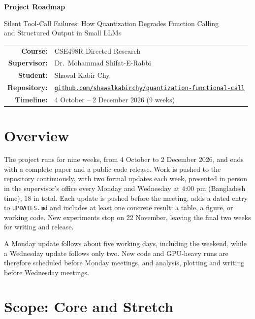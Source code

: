 \documentclass[11pt,a4paper]{article}
\newcommand{\studentname}{Shawal Kabir Chy.}
\begin{document}
{\centering\LARGE\bfseries Project Roadmap\par}
\vspace{6pt}
{\centering\large Silent Tool-Call Failures: How Quantization Degrades Function Calling\\
and Structured Output in Small LLMs\par}
\vspace{12pt}
{\centering
\begin{tabular}{rl}
\textbf{Course:}     & CSE498R Directed Research \\
\textbf{Supervisor:} & Dr.\ Mohammad Shifat-E-Rabbi \\
\textbf{Student:}    & \studentname \\
\textbf{Repository:} & \href{https://github.com/shawalkabirchy/quantization-functional-call}{\texttt{github.com/shawalkabirchy/quantization-functional-call}} \\
\textbf{Timeline:}   & 4 October -- 2 December 2026 (9 weeks) \\
\end{tabular}\par}
\vspace{6pt}

\section{Overview}

The project runs for nine weeks, from 4 October to 2 December 2026, and ends with a complete paper
and a public code release. Work is pushed to the repository continuously, with two formal updates
each week, presented in person in the supervisor's office every Monday and Wednesday at 4:00 pm
(Bangladesh time), 18 in total. Each update is pushed before the meeting, adds a dated entry to
\texttt{UPDATES.md} and includes at least one concrete result: a table, a figure, or working code.
New experiments stop on 22 November, leaving the final two weeks for writing and release.

A Monday update follows about five working days, including the weekend, while a Wednesday update
follows only two. New code and GPU-heavy runs are therefore scheduled before Monday meetings, and
analysis, plotting and writing before Wednesday meetings.

\section{Scope: Core and Stretch}
\end{document}
